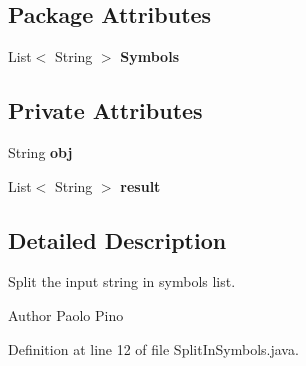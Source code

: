 \subsection*{Package Attributes}
\begin{DoxyCompactItemize}
\item 
\hypertarget{classinput_parser_1_1_split_in_symbols_a836e7a18e11ec95b69ea0f6290cd4ddc}{List$<$ String $>$ {\bfseries Symbols}}\label{classinput_parser_1_1_split_in_symbols_a836e7a18e11ec95b69ea0f6290cd4ddc}

\end{DoxyCompactItemize}
\subsection*{Private Attributes}
\begin{DoxyCompactItemize}
\item 
\hypertarget{classinput_parser_1_1_split_in_symbols_a138c39545ac828c3d4080b90921a7c8f}{String {\bfseries obj}}\label{classinput_parser_1_1_split_in_symbols_a138c39545ac828c3d4080b90921a7c8f}

\item 
\hypertarget{classinput_parser_1_1_split_in_symbols_ab1617b12d58b08074715629c2a285d0d}{List$<$ String $>$ {\bfseries result}}\label{classinput_parser_1_1_split_in_symbols_ab1617b12d58b08074715629c2a285d0d}

\end{DoxyCompactItemize}


\subsection{Detailed Description}
Split the input string in symbols list. 

\begin{DoxyAuthor}{Author}
Paolo Pino 
\end{DoxyAuthor}


Definition at line 12 of file Split\-In\-Symbols.\-java.



